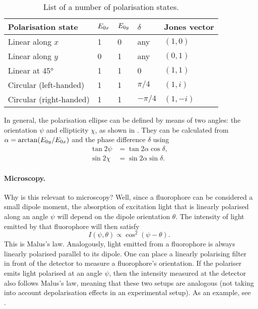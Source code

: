 \begin{table}
	\centering
	\begin{tabular}{lllll}
		\toprule
		Polarisation state      & $ E_{0x} $ & $ E_{0y} $ & $ \delta $ & Jones vector \\ \midrule
		Linear along $ x $      & 1            & 0            & any        & $ (1, 0) $   \\
		Linear along $ y $      & 0            & 1            & any        & $ (0, 1) $   \\
		Linear at \ang{45}      & 1            & 1            & 0          & $ (1, 1) $   \\
		Circular (left-handed)  & 1            & 1            & $ \pi/4 $  & $ (1, i) $   \\
		Circular (right-handed) & 1            & 1            & $ -\pi/4 $ & $ (1, -i) $  \\ \bottomrule
	\end{tabular}
	\caption{List of a number of polarisation states.}
	\label{tab:polarisation states}
\end{table}


In general, the polarisation ellipse can be defined by means of two angles: the orientation $ \psi $ and ellipticity $ \chi $, as shown in . They can be calculated from $ \alpha = \arctan(E_{0y}/E_{0x}) $ and the phase difference $ \delta $ using
\begin{align}
	\tan 2\psi &= \tan 2\alpha \cos \delta,\\
	\sin 2\chi &= \sin 2\alpha \sin \delta.
\end{align}

\paragraph{Microscopy.} Why is this relevant to microscopy? Well, since a fluorophore can be considered a small dipole moment, the absorption of excitation light that is linearly polarised along an angle $ \psi $ will depend on the dipole orientation $ \theta $. The intensity of light emitted by that fluorophore will then satisfy 
\begin{equation}
	\label{eq:malus}
	I(\psi, \theta) \propto \cos^2(\psi-\theta).
\end{equation}
This is Malus's law. Analogously, light emitted from a fluorophore is always linearly polarised parallel to its dipole. One can place a linearly polarising filter in front of the detector to measure a fluorophore's orientation. If the polariser emits light polarised at an angle $ \psi $, then the intensity measured at the detector also follows Malus's law, meaning that these two setups are analogous (not taking into account depolarisation effects in an experimental setup). As an example, see .

